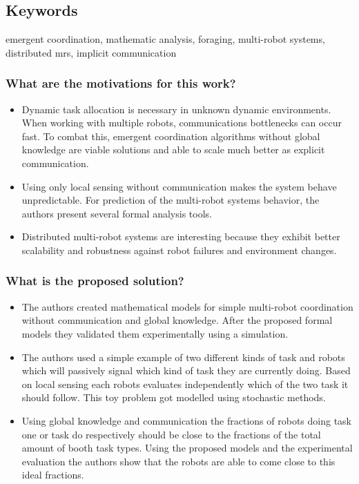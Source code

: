     \subsection*{Keywords}
    emergent coordination, mathematic analysis, foraging, multi-robot systems, distributed mrs, implicit communication
    
     
    \subsubsection*{What are the motivations for this work?}
    \begin{itemize}
        \item Dynamic task allocation is necessary in unknown dynamic environments. When working with multiple robots, communications bottlenecks can occur fast. To combat this, emergent coordination algorithms without global knowledge are viable solutions and able to scale much better as explicit communication.
        \item Using only local sensing without communication makes the system behave unpredictable. For prediction of the multi-robot systems behavior, the authors present several formal analysis tools. 
        \item Distributed multi-robot systems are interesting because they exhibit better scalability and robustness against robot failures and environment changes. 
    \end{itemize}
    \subsubsection*{What is the proposed solution?}
    \begin{itemize}
        \item The authors created mathematical models for simple multi-robot coordination without communication and global knowledge. After the proposed formal models they validated them experimentally using a simulation.
        \item The authors used a simple example of two different kinds of task and robots which will passively signal which kind of task they are currently doing. Based on local sensing each robots evaluates independently which of the two task it should follow. This toy problem got modelled using  stochastic methods.
        \item Using global knowledge and communication the fractions of robots doing task one or task do respectively should be close to the fractions of the total amount of booth task types. Using the proposed models and the experimental evaluation the authors show that the robots are able to come close to this ideal fractions.
    \end{itemize}
